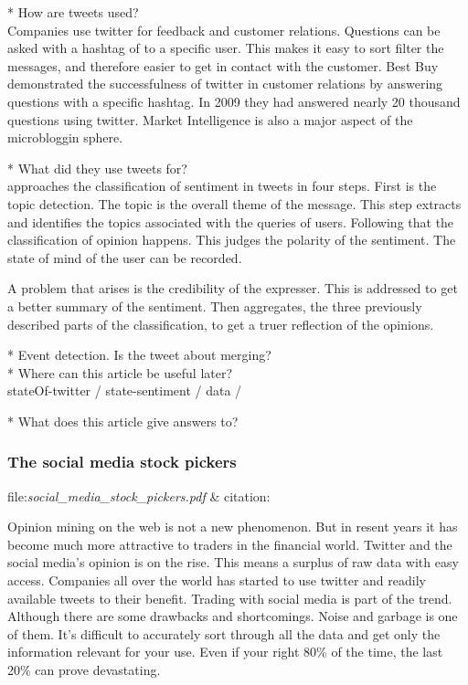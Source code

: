 * How are tweets used?\\
Companies use twitter for feedback and customer relations. Questions can be
asked with a hashtag of to a specific user. This makes it easy to sort filter
the messages, and therefore easier to get in contact with the customer. Best
Buy demonstrated the successfulness of twitter in customer relations by
answering questions with a specific hashtag. In 2009 they had answered nearly
20 thousand questions using twitter. \cite[p1]{Li2013206}
Market Intelligence is also a major aspect of the microbloggin sphere. 

* What did they use tweets for?\\
\cite[]{Li2013206} approaches the classification of sentiment in tweets in four
steps. First is the topic detection. The topic is the overall theme of the
message. This step extracts and identifies the topics associated with the
queries of users. Following that the classification of opinion happens. This
judges the polarity of the sentiment. The state of mind of the user can be
recorded. 

A problem that arises is the credibility of the expresser. This is addressed to
get a better summary of the sentiment. Then \cite[]{Li2013206} aggregates, the
three previously described parts of the classification, to get a truer
reflection of the opinions. 


* Event detection. Is the tweet about merging? \\
* Where can this article be useful later? \\
stateOf-twitter / state-sentiment /  data / 

* What does this article give answers to?\\

\subsubsection{The social media stock pickers}
file:\textit{social\_media\_stock\_pickers.pdf} & citation:\cite[]{stevenson12:social_media_stock_pickers}

Opinion mining on the web is not a new phenomenon. But in resent years it has
become much more attractive to traders in the financial world. Twitter and the
social media's opinion is on the rise. This means a surplus of raw data with
easy access. Companies all over the world has started to use twitter and
readily available tweets to their benefit. Trading with social media is part of
the trend. Although there are some drawbacks and shortcomings. Noise and
garbage is one of them. It's difficult to accurately sort through all the data
and get only the information relevant for your use. Even if your right 80\% of
the time, the last 20\% can prove devastating. \cite[]{stevenson12:social_media_stock_pickers}

